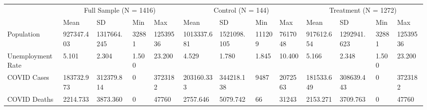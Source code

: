 \begin{tabular}{lllllllllllll}
\toprule
 & \multicolumn{4}{c}{Full Sample (N = 1416)} & \multicolumn{4}{c}{Control (N = 144)} & \multicolumn{4}{c}{Treatment (N = 1272)} \\
 & Mean & SD & Min & Max & Mean & SD & Min & Max & Mean & SD & Min & Max \\
\midrule
Population & 927347.403 & 1317664.245 & 32881 & 12539536 & 1013337.681 & 1521098.105 & 111209 & 7617048 & 917612.654 & 1292941.623 & 32881 & 12539536 \\
Unemployment Rate & 5.101 & 2.304 & 1.500 & 23.200 & 4.529 & 1.780 & 1.845 & 10.400 & 5.166 & 2.348 & 1.500 & 23.200 \\
COVID Cases & 183732.973 & 312379.814 & 0 & 3723182 & 203160.333 & 344218.138 & 9487 & 2072563 & 181533.649 & 308639.443 & 0 & 3723182 \\
COVID Deaths & 2214.733 & 3873.360 & 0 & 47760 & 2757.646 & 5079.742 & 66 & 31243 & 2153.271 & 3709.763 & 0 & 47760 \\
\bottomrule
\end{tabular}
